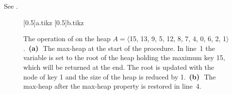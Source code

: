 See .
\begin{figure}[htb]
    \subcaptionbox{\label{fig:6.5-1a}}[0.5\textwidth]{{a.tikz}}
    \subcaptionbox{\label{fig:6.5-1b}}[0.5\textwidth]{{b.tikz}}
    \caption{The operation of  on the heap $A=\langle$15, 13, 9, 5, 12, 8, 7, 4, 0, 6, 2, 1$\rangle$.\,
    \textbf{(a)}\,~The max-heap at the start of the procedure.
    In line~1 the variable  is set to the root of the heap holding the maximum key 15, which will be returned at the end.
    The root is updated with the node of key 1 and the size of the heap is reduced by 1.\,
    \textbf{(b)}\,~The max-heap after the max-heap property is restored in line~4.} \label{fig:6.5-1}
\end{figure}
